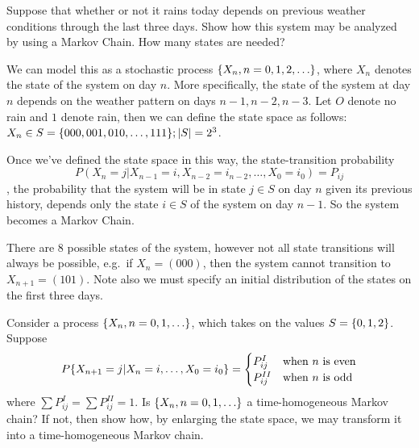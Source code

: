 \documentclass{article}
\begin{document}
    \makemytitle

    \nextproblem
    \nextproblem

    \begin{problem}
        Suppose that whether or not it rains today depends on previous weather conditions through the last three days. Show how this system may be analyzed by using a Markov Chain. How many states are needed?
    \end{problem}

    \begin{solution}
        We can model this as a stochastic process $\{X_n, n=0,1,2,\ldots\}$, where $X_n$ denotes the state of the system on day $n$. More specifically, the state of the system at day $n$ depends on the weather pattern on days $n-1, n-2, n-3$. Let $O$ denote no rain and $1$ denote rain, then we can define the state space as follows: $X_n \in S = \{000,001, 010, \ldots, 111\}; |S| = 2^3$.

        Once we've defined the state space in this way, the state-transition probability
        \begin{equation}
            P(X_n = j | X_{n-1} = i, X_{n-2} = i_{n-2}, \ldots, X_0 = {i_0}) = P_{ij}
        \end{equation}
        , the probability that the system will be in state $j \in S$ on day $n$ given its previous history, depends only the state $i \in S$ of the system on day $n-1$. So the system becomes a Markov Chain.

        There are 8 possible states of the system, however not all state transitions will always be possible, e.g.~if $X_n = (000)$, then the system cannot transition to $X_{n+1} = (101)$. Note also we must specify an initial distribution of the states on the first three days.
        
    \end{solution}

    \nextproblem

    \begin{problem}
        Consider a process $\{X_n, n=0,1,\ldots\}$, which takes on the values $S = \{0,1,2\}$. Suppose
        \begin{equation*}
            P\{X_{n+1}=j|X_n=i,\ldots,X_0=i_0\} = \begin{cases}
                P^I_{ij} & \text{when $n$ is even} \\
                P^{II}_{ij} & \text{when $n$ is odd}
            \end{cases}
        \end{equation*}
        where $\sum P^I_{ij} = \sum P^{II}_{ij} = 1$. Is $\{X_n, n=0,1,\ldots\}$ a time-homogeneous Markov chain? If not, then show how, by enlarging the state space, we may transform it into a time-homogeneous Markov chain.
    \end{problem}
\end{document}
